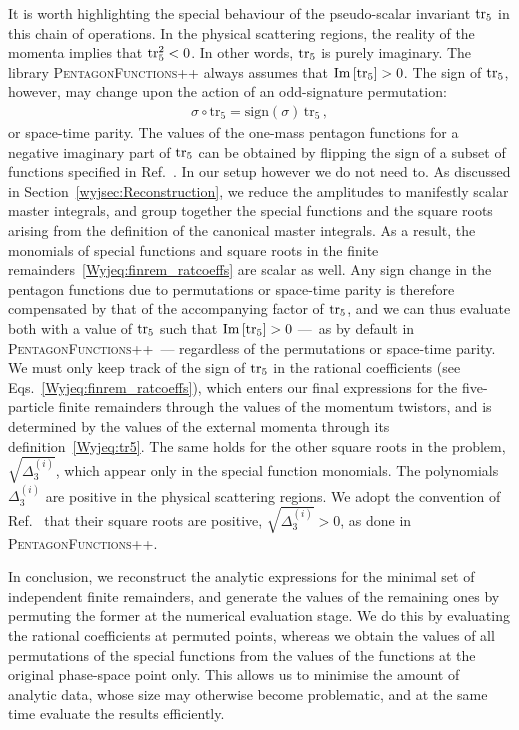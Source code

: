 \documentclass[main.tex]{subfiles}
\begin{document}
It is worth highlighting the special behaviour of the pseudo-scalar invariant $\operatorname{\rm tr}_5$ in this chain of operations. In the physical scattering regions, the reality of the momenta implies that $\operatorname{\rm tr}_5^2 < 0$. In other words, $\operatorname{\rm tr}_5$ is purely imaginary. The library \textsc{PentagonFunctions++} always assumes that $\text{Im}\left[\operatorname{\rm tr}_5\right]>0$. The sign of $\operatorname{\rm tr}_5$, however, may change upon the action of an odd-signature permutation:
\begin{align}
\sigma \circ \text{tr}_5 = \text{sign}(\sigma) \, \text{tr}_5 \,,
\end{align}
or space-time parity.
The values of the one-mass pentagon functions for a negative imaginary part of $\operatorname{\rm tr}_5$ can be obtained by flipping the sign of a subset of functions specified in Ref.~\cite{Chicherin:2021dyp}. In our setup however we do not need to. As discussed in Section~\ref{wyjsec:Reconstruction}, we reduce the amplitudes to manifestly scalar master integrals, and group together the special functions and the square roots arising from the definition of the canonical master integrals. As a result, the monomials of special functions and square roots in the finite remainders~\eqref{Wyjeq:finrem_ratcoeffs} are scalar as well. Any sign change in the pentagon functions due to permutations or space-time parity is therefore compensated by that of the accompanying factor of $\operatorname{\rm tr}_5$, and we can thus evaluate both with a value of $\operatorname{\rm tr}_5$ such that $\text{Im}\left[\operatorname{\rm tr}_5\right]>0$ ---~as by default in \textsc{PentagonFunctions++}~--- regardless of the permutations or space-time parity. We must only keep track of the sign of $\operatorname{\rm tr}_5$ in the rational coefficients (see Eqs.~\eqref{Wyjeq:finrem_ratcoeffs}), which enters our final expressions for the five-particle finite remainders through the values of the momentum twistors, and is determined by the values of the external momenta through its definition~\eqref{Wyjeq:tr5}.
The same holds for the other square roots in the problem, $\sqrt{\Delta_3^{(i)}}$, which appear only in the special function monomials. The polynomials $\Delta_3^{(i)}$ are positive in the physical scattering regions. We adopt the convention of Ref.~\cite{Chicherin:2021dyp} that their square roots are positive, $\sqrt{\Delta_3^{(i)}}>0$, as done in \textsc{PentagonFunctions++}.

In conclusion, we reconstruct the analytic expressions for the minimal set of independent finite remainders, and generate the values of the remaining ones by permuting the former at the numerical evaluation stage. We do this by evaluating the rational coefficients at permuted points, whereas we obtain the values of all permutations of the special functions from the values of the functions at the original phase-space point only. This allows us to minimise the amount of analytic data, whose size may otherwise become problematic, and at the same time evaluate the results efficiently.
\end{document}
